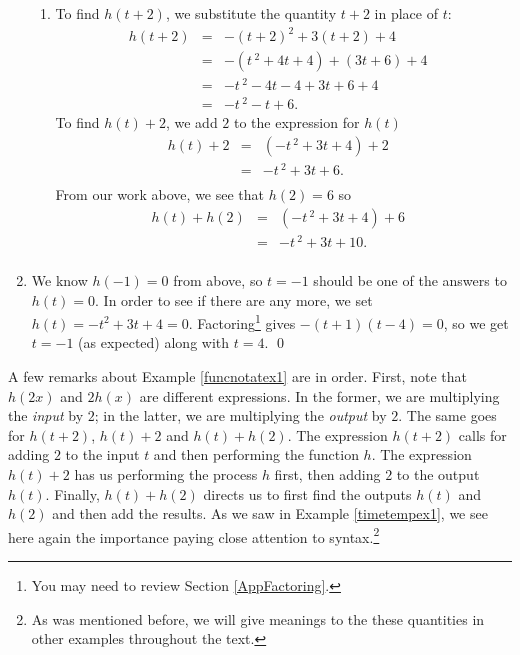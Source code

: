 \begin{ex}
\begin{enumerate}
\begin{enumerate}
\item  To find $h(t + 2)$, we substitute the quantity $t + 2$ in place of $t$: \[ \begin{array}{rclr}  
h(t + 2) & = & -(t + 2)^2 + 3(t + 2) + 4 & \\ [2pt]
         & = & -\left(t\,^{2} + 4t + 4\right) + (3t + 6) + 4 & \\ [2pt]
         & = & -t\,^{2} - 4t - 4 + 3t + 6 + 4 &  \\ [2pt]
         & = & -t\,^{2} - t + 6. & 
       \end{array} \] To find $h(t) + 2$, we add $2$ to the expression for $h(t)$ \[ \begin{array}{rclr}  
h(t) + 2 & = & \left(-t\,^{2} + 3t + 4\right) + 2  & \\ [2pt]
         & = & -t\,^{2} + 3t + 6. \\ 
         \end{array} \] From our work above, we see that $h(2) = 6$ so \[ \begin{array}{rclr}  
h(t) + h(2) & = & \left(-t\,^{2} + 3t + 4\right) + 6  & \\ [2pt]
            & = & -t\,^{2} + 3t + 10. \\ 
            \end{array} \]

\end{enumerate}

\item   We know $h(-1) = 0$ from above, so $t=-1$ should be one of the answers to $h(t) = 0$.  In order to see if there are any more, we set  $h(t) = -t^2+3t+4 = 0$. Factoring\footnote{You may need to review Section \ref{AppFactoring}.} gives $-(t+1)(t-4) = 0$, so we get $t=-1$ (as expected) along with $t=4$. \qed   
         
\end{enumerate}
\end{ex}

A few remarks about Example \ref{funcnotatex1} are in order.  First, note that $h(2x)$ and $2 h(x)$ are different expressions.  In the former, we are multiplying the \textit{input} by $2$;  in the latter, we are multiplying the \textit{output} by $2$.  The same goes for $h(t + 2)$, $h(t) + 2$ and $h(t) + h(2)$.  The expression $h(t + 2)$ calls for adding $2$ to the input $t$ and then performing the function $h$.  The expression $h(t) + 2$ has us performing the process $h$ first, then adding $2$ to the output $h(t)$.  Finally, $h(t) + h(2)$ directs us to first find the outputs $h(t)$ and $h(2)$ and then add the results.  As we saw in Example \ref{timetempex1},  we see here again the importance paying close attention to syntax.\footnote{As was mentioned before, we will give meanings to the these quantities in other examples throughout the text.}

